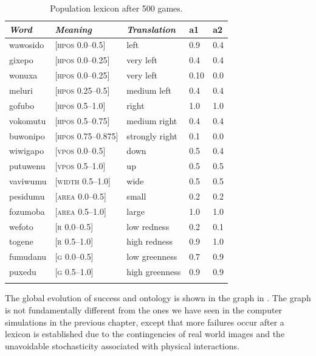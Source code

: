 \begin{table}
\begin{center}
\begin{tabular}{lllll}
\lsptoprule
{\itshape Word}&{\itshape Meaning}&{\itshape Translation} & {\bfshape a1}&{\bfshape a2} \\ \midrule
wawosido & [\textsc{hpos} 0.0–0.5] &left&0.9&0.4\\ 
gixepo & [\textsc{hpos} 0.0–0.25] & very left&0.4&0.4\\ 
wonuxa & [\textsc{hpos} 0.0–0.25] & very left&0.10&0.0\\ 
meluri & [\textsc{hpos} 0.25–0.5] &medium left&0.4&0.4\\ 
gofubo & [\textsc{hpos} 0.5–1.0]& right&1.0&1.0\\ 
vokomutu & [\textsc{hpos} 0.5–0.75] &medium right&0.4&0.4\\ 
buwonipo & [\textsc{hpos} 0.75–0.875] &strongly right&0.1&0.0\\ 
wiwigapo & [\textsc{vpos} 0.0–0.5] &down&0.5&0.4\\ 
putuwenu & [\textsc{vpos} 0.5–1.0]&up & 0.5&0.5\\ 
vaviwumu & [\textsc{width} 0.5–1.0]&wide & 0.5&0.5\\ 
pesidumu & [\textsc{area} 0.0–0.5]&small& 0.2&0.2\\ 
fozumoba & [\textsc{area} 0.5–1.0]&large & 1.0&1.0\\ 
wefoto & [\textsc{r} 0.0–0.5]& low redness &0.2&0.1\\ 
togene & [\textsc{r} 0.5–1.0]& high redness &0.9&1.0\\ 
fumudanu & [\textsc{g} 0.0–0.5]& low greenness &0.7&0.9\\ 
puxedu & [\textsc{g} 0.5–1.0]& high greenness &0.9&0.9\\ 
\lspbottomrule
\end{tabular}
\caption{\label{tab:puxedu}Population lexicon after 500 games.}
\end{center}
\end{table}
The global evolution of success and ontology is shown in the 
graph in . The graph is not 
fundamentally different from the ones we have
seen in the computer simulations in the previous
chapter, except that more failures occur after a lexicon
is established due to the contingencies of real 
world images and the unavoidable stochasticity 
associated with physical interactions. 

